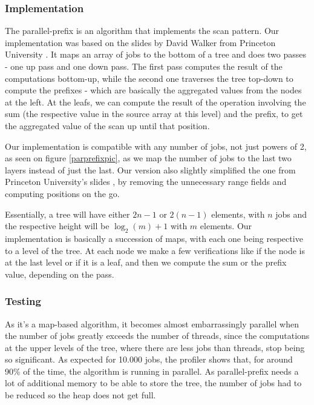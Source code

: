 \documentclass[10pt,journal]{IEEEtran}
\begin{document}
\subsubsection{Implementation}

The parallel-prefix is an algorithm that implements the scan pattern. Our implementation was based on the slides by David Walker from Princeton University \cite{parprefix}. It maps an array of jobs to the bottom of a tree and does two passes - one up pass and one down pass. The first pass computes the result of the computations bottom-up, while the second one traverses the tree top-down to compute the prefixes - which are basically the aggregated values from the nodes at the left. At the leafs, we can compute the result of the operation involving the sum (the respective value in the source array at this level) and the prefix, to get the aggregated value of the scan up until that position.

Our implementation is compatible with any number of jobs, not just powers of 2, as seen on figure \ref{parprefixpic}, as we map the number of jobs to the last two layers instead of just the last. Our version also slightly simplified the one from Princeton University's slides \cite{parprefix}, by removing the unnecessary range fields and computing positions on the go.

Essentially, a tree will have either $ 2n - 1 $ or $ 2(n - 1) $ elements, with $ n $ jobs and the respective height will be $ \log_2(m) + 1 $ with $ m $ elements. Our implementation is basically a succession of maps, with each one being respective to a level of the tree. At each node we make a few verifications like if the node is at the last level or if it is a leaf, and then we compute the sum or the prefix value, depending on the pass. 

\subsubsection{Testing}

As it's a map-based algorithm, it becomes almost embarrassingly parallel when the number of jobs greatly exceeds the number of threads, since the computations at the upper levels of the tree, where there are less jobs than threads, stop being so significant. As expected for 10.000 jobs, the profiler shows that, for around 90\% of the time, the algorithm is running in parallel. As parallel-prefix needs a lot of additional memory to be able to store the tree, the number of jobs had to be reduced so the heap does not get full. 
\end{document}
